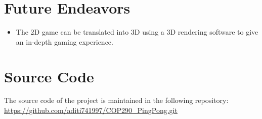 \documentclass{article}
\begin{document}
	\section{Future Endeavors}
	\begin{itemize}
	\item The 2D game can be translated into 3D using a 3D rendering software to give an in-depth gaming experience. 
	\end{itemize}

	\section{Source Code}
	The source code of the project is maintained in the following repository: \\
	\url{https://github.com/aditi741997/COP290_PingPong.git}
	
	\medskip
	
\end{document}
